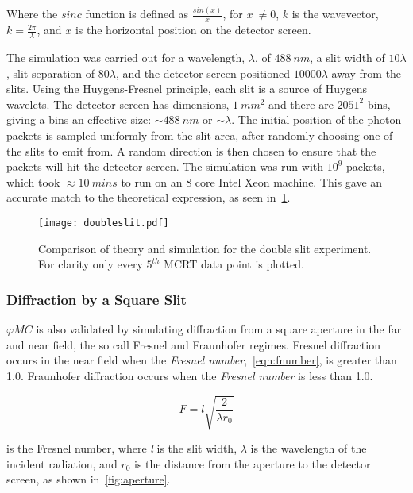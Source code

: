 Where the $sinc$ function is defined as $\tfrac{sin(x)}{x}$, for $x\ \neq 0$, $k$ is the wavevector, $k=\tfrac{2\pi}{\lambda}$, and $x$ is the horizontal position on the detector screen.

The simulation was carried out for a wavelength, $\lambda$,  of $488~nm$, a slit width of $10\lambda$, slit separation of $80\lambda$, and the detector screen positioned $10000\lambda$ away from the slits.
Using the Huygens-Fresnel principle, each slit is a source of Huygens wavelets.
The detector screen has dimensions, $1~mm^2$ and there are $2051^2$ bins, giving a bins an effective size: $\sim 488~nm$ or $\sim \lambda$.
The initial position of the photon packets is sampled uniformly from the slit area, after randomly choosing one of the slits to emit from.
A random direction is then chosen to ensure that the packets will hit the detector screen.
The simulation was run with $10^9$ packets, which took $\approx10~mins$ to run on an 8 core Intel Xeon machine.
This gave an accurate match to the theoretical expression, as seen in~\cref{fig:doubleslitcomp}.

\begin{figure}[!ht]
    \centering
    \texttt{[image: doubleslit.pdf]}
    \caption{Comparison of theory and simulation for the double slit experiment. For clarity only every $5^{th}$ MCRT data point is plotted.}
    \label{fig:doubleslitcomp}
\end{figure}

\subsubsection*{Diffraction by a Square Slit}
$\varphi MC$ is also validated by simulating diffraction from a square aperture in the far and near field, the so call Fresnel and Fraunhofer regimes. 
Fresnel diffraction occurs in the near field when the \textit{Fresnel number},~\cref{eqn:fnumber}, is greater than 1.0.
Fraunhofer diffraction occurs when the \textit{Fresnel number} is less than 1.0.

\begin{equation}
F = l\sqrt{\frac{2}{\lambda r_0}}
\label{eqn:fnumber}
\end{equation}

 is the Fresnel number, where \textit{l} is the slit width, $\lambda$ is the wavelength of the incident radiation, and $r_0$ is the distance from the aperture to the detector screen, as shown in~\cref{fig:aperture}. 

